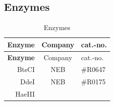 \documentclass[11pt,singlespacinge,twoside]{reedthesis} %
\begin{document}
\hypertarget{mat-enz}{%
\subsection{Enzymes}\label{mat-enz}}
\begin{longtable}[]{@{}rcl@{}}
\caption{\label{tab:mat-enz} Enzymes}\tabularnewline
\toprule
\begin{minipage}[b]{0.25\columnwidth}\raggedleft
\textbf{Enzyme}\strut
\end{minipage} & \begin{minipage}[b]{0.50\columnwidth}\centering
Company\strut
\end{minipage} & \begin{minipage}[b]{0.16\columnwidth}\raggedright
cat.-no.\strut
\end{minipage}\tabularnewline
\midrule
\endfirsthead
\toprule
\begin{minipage}[b]{0.25\columnwidth}\raggedleft
\textbf{Enzyme}\strut
\end{minipage} & \begin{minipage}[b]{0.50\columnwidth}\centering
Company\strut
\end{minipage} & \begin{minipage}[b]{0.16\columnwidth}\raggedright
cat.-no.\strut
\end{minipage}\tabularnewline
\midrule
\endhead
\begin{minipage}[t]{0.25\columnwidth}\raggedleft
BtsCI\strut
\end{minipage} & \begin{minipage}[t]{0.50\columnwidth}\centering
NEB\strut
\end{minipage} & \begin{minipage}[t]{0.16\columnwidth}\raggedright
\#R0647\strut
\end{minipage}\tabularnewline
\begin{minipage}[t]{0.25\columnwidth}\raggedleft
DdeI\strut
\end{minipage} & \begin{minipage}[t]{0.50\columnwidth}\centering
NEB\strut
\end{minipage} & \begin{minipage}[t]{0.16\columnwidth}\raggedright
\#R0175\strut
\end{minipage}\tabularnewline
\begin{minipage}[t]{0.25\columnwidth}\raggedleft
HaeIII\strut
\end{minipage} & \begin{minipage}[t]{0.50\columnwidth}\centering

\end{minipage}
\end{longtable}
\end{document}
